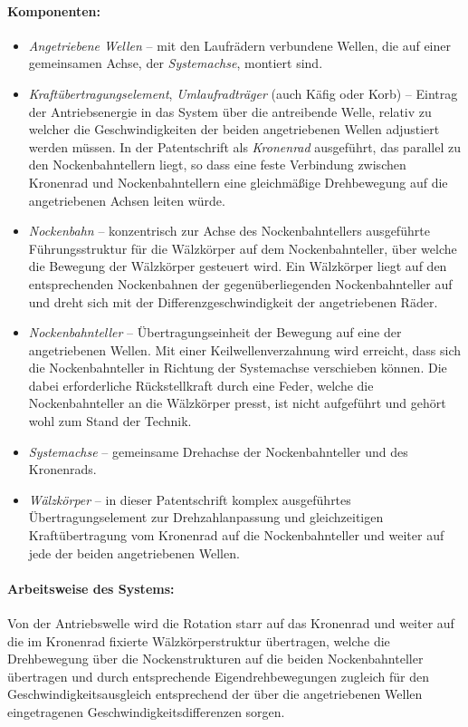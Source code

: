 \documentclass[11pt,a4paper]{article}
\begin{document}
\paragraph{Komponenten:}
\begin{itemize}
\item \emph{Angetriebene Wellen} -- mit den Laufrädern verbundene Wellen, die
  auf einer gemeinsamen Achse, der \emph{Systemachse}, montiert sind. 
\item \emph{Kraftübertragungselement}, \emph{Umlaufradträger} (auch Käfig oder
  Korb) -- Eintrag der Antriebsenergie in das System über die antreibende
  Welle, relativ zu welcher die Geschwindigkeiten der beiden angetriebenen
  Wellen adjustiert werden müssen.  In der Patentschrift als \emph{Kronenrad}
  ausgeführt, das parallel zu den Nockenbahntellern liegt, so dass eine feste
  Verbindung zwischen Kronenrad und Nockenbahntellern eine gleichmäßige
  Drehbewegung auf die angetriebenen Achsen leiten würde.
\item \emph{Nockenbahn} -- konzentrisch zur Achse des Nockenbahntellers
  ausgeführte Führungs\-struktur für die Wälzkörper auf dem Nockenbahnteller,
  über welche die Bewegung der Wälzkörper gesteuert wird.  Ein Wälzkörper
  liegt auf den entsprechenden Nockenbahnen der gegenüberliegenden
  Nockenbahnteller auf und dreht sich mit der Differenzgeschwindigkeit der
  angetriebenen Räder.
\item \emph{Nockenbahnteller} -- Übertragungseinheit der Bewegung auf eine der
  angetriebenen Wellen. Mit einer Keilwellenverzahnung wird erreicht, dass
  sich die Nockenbahnteller in Richtung der Systemachse verschieben können.
  Die dabei erforderliche Rück\-stell\-kraft durch eine Feder, welche die
  Nockenbahnteller an die Wälzkörper presst, ist nicht aufgeführt und gehört
  wohl zum Stand der Technik.
\item \emph{Systemachse} -- gemeinsame Drehachse der Nockenbahnteller und des
  Kronenrads. 
\item \emph{Wälzkörper} -- in dieser Patentschrift komplex ausgeführtes
  Übertragungselement zur Drehzahlanpassung und gleichzeitigen
  Kraftübertragung vom Kronenrad auf die Nockenbahnteller und weiter auf jede
  der beiden angetriebenen Wellen.
\end{itemize}

\paragraph{Arbeitsweise des Systems:}
Von der Antriebswelle wird die Rotation starr auf das Kronenrad und weiter auf
die im Kronenrad fixierte Wälzkörperstruktur übertragen, welche die
Drehbewegung über die Nockenstrukturen auf die beiden Nockenbahnteller
übertragen und durch entsprechende Eigendrehbewegungen zugleich für den
Geschwindigkeitsausgleich entsprechend der über die angetriebenen Wellen
eingetragenen Geschwindigkeitsdifferenzen sorgen.
\end{document}
